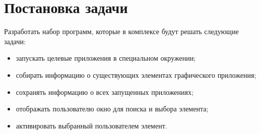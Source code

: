 \chapter{Постановка задачи}

Разработать набор программ, которые в комплексе будут решать следующие задачи:
\begin{itemize}
	\item запускать целевые приложения в специальном окружении;
	\item собирать информацию о существующих элементах графического приложения;
    \item сохранять информацию о всех запущенных приложениях;
    \item отображать пользователю окно для поиска и выбора элемента;
    \item активировать выбранный пользователем элемент.
\end{itemize}